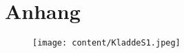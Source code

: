\section{Anhang}\label{sec:Anhang}
\begin{figure}[h]
   \centering
    \texttt{[image: content/KladdeS1.jpeg]}
\end{figure}
\pagebreak